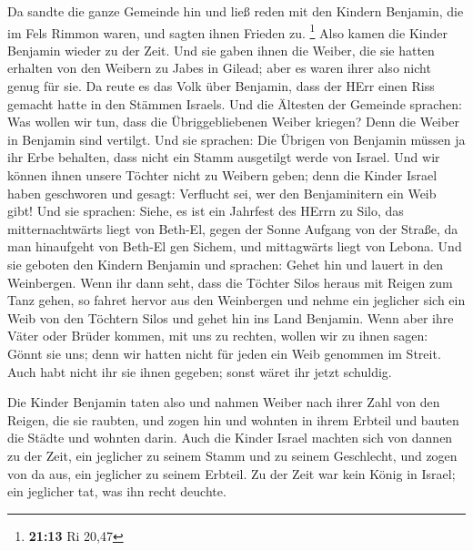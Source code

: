  Da sandte die ganze Gemeinde hin und ließ reden mit den
Kindern Benjamin, die im Fels Rimmon waren, und sagten ihnen Frieden zu.
\footnote{\textbf{21:13} Ri 20,47}  Also kamen die Kinder
Benjamin wieder zu der Zeit. Und sie gaben ihnen die Weiber, die sie
hatten erhalten von den Weibern zu Jabes in Gilead; aber es waren ihrer
also nicht genug für sie.  Da reute es das Volk über
Benjamin, dass der HErr einen Riss gemacht hatte in den Stämmen Israels.
 Und die Ältesten der Gemeinde sprachen: Was wollen wir
tun, dass die Übriggebliebenen Weiber kriegen? Denn die Weiber in
Benjamin sind vertilgt.  Und sie sprachen: Die Übrigen von
Benjamin müssen ja ihr Erbe behalten, dass nicht ein Stamm ausgetilgt
werde von Israel.  Und wir können ihnen unsere Töchter
nicht zu Weibern geben; denn die Kinder Israel haben geschworen und
gesagt: Verflucht sei, wer den Benjaminitern ein Weib gibt!
 Und sie sprachen: Siehe, es ist ein Jahrfest des HErrn zu
Silo, das mitternachtwärts liegt von Beth-El, gegen der Sonne Aufgang
von der Straße, da man hinaufgeht von Beth-El gen Sichem, und
mittagwärts liegt von Lebona.  Und sie geboten den Kindern
Benjamin und sprachen: Gehet hin und lauert in den Weinbergen.
 Wenn ihr dann seht, dass die Töchter Silos heraus mit
Reigen zum Tanz gehen, so fahret hervor aus den Weinbergen und nehme ein
jeglicher sich ein Weib von den Töchtern Silos und gehet hin ins Land
Benjamin.  Wenn aber ihre Väter oder Brüder kommen, mit uns
zu rechten, wollen wir zu ihnen sagen: Gönnt sie uns; denn wir hatten
nicht für jeden ein Weib genommen im Streit. Auch habt nicht ihr sie
ihnen gegeben; sonst wäret ihr jetzt schuldig.

 Die Kinder Benjamin taten also und nahmen Weiber nach
ihrer Zahl von den Reigen, die sie raubten, und zogen hin und wohnten in
ihrem Erbteil und bauten die Städte und wohnten darin. 
Auch die Kinder Israel machten sich von dannen zu der Zeit, ein
jeglicher zu seinem Stamm und zu seinem Geschlecht, und zogen von da
aus, ein jeglicher zu seinem Erbteil.  Zu der Zeit war kein
König in Israel; ein jeglicher tat, was ihn recht deuchte.
